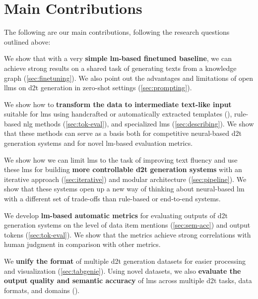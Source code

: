 \section{Main Contributions}
\label{sec:contributions}


The following are our main contributions, following the research questions outlined above:

\begin{description}[leftmargin=\widthof{\textbf{Ad RQ1\ \ }}]
    \item[Ad \ref{rq:1}] We show that  with a very \textbf{simple \ac{lm}-based finetuned baseline}, we can achieve strong results on a shared task of generating texts from a knowledge graph (\autoref{sec:finetuning}). We also point out the advantages and limitations of open \acp{llm} on \ac{d2t} generation in zero-shot settings (\autoref{sec:prompting}).
    \item[Ad \ref{rq:2}] We show how to \textbf{transform the data to intermediate text-like input} suitable for \acp{lm} using handcrafted or automatically extracted templates (), rule-based \ac{nlg} methods (\autoref{sec:tok-eval}), and specialized \acp{lm} (\autoref{sec:describing}). We show that these methods can serve as a basis both for competitive neural-based \ac{d2t} generation systems and for novel \ac{lm}-based evaluation metrics.
    \item[Ad \ref{rq:3}] We show how we can limit \acp{lm} to the task of improving text fluency and use these \acp{lm} for building \textbf{more controllable \ac{d2t} generation systems} with an iterative approach (\autoref{sec:iterative}) and modular architecture (\autoref{sec:pipeline}). We show that these systems open up a new way of thinking about neural-based \ac{lm} with a different set of trade-offs than rule-based or end-to-end systems.
    \item[Ad \ref{rq:4}] We develop \textbf{\ac{lm}-based automatic metrics} for evaluating outputs of \ac{d2t} generation systems on the level of data item mentions (\autoref{sec:sem-acc}) and output tokens (\autoref{sec:tok-eval}). We show that the metrics achieve strong correlations with human judgment in comparison with other metrics.
    \item[Ad \ref{rq:5}] We \textbf{unify the format} of multiple \ac{d2t} generation datasets for easier processing and visualization (\autoref{sec:tabgenie}). Using novel datasets, we also \textbf{evaluate the output quality and semantic accuracy} of \acp{lm} across multiple \ac{d2t} tasks, data formats, and domains ().
\end{description}



